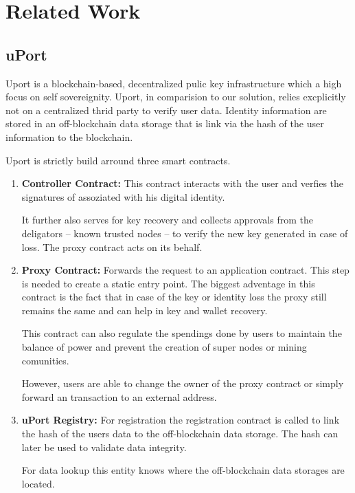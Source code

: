 \chapter{Related Work}
\label{cha:relatedwork}

\section{uPort}
Uport is a blockchain-based, decentralized pulic key infrastructure which a high focus on self sovereignity. Uport, in comparision to our solution, relies excplicitly not on a centralized thrid party to verify user data.\cite[p. 2]{uPortWhitePaper}
Identity information are stored in an off-blockchain data storage that is link via the hash of the user information to the blockchain. 

Uport is strictly build arround three smart contracts. 
\begin{enumerate}
\item \textbf{Controller Contract:} This contract interacts with the user and verfies the signatures of assoziated with his digital identity.

It further also serves for key recovery and collects approvals from the deligators -- known trusted nodes -- to verify the new key generated in case of loss.
The proxy contract acts on its behalf. 

\item \textbf{Proxy Contract:}
Forwards the request to an application contract. This step is needed to create a static entry point.
The biggest adventage in this contract is the fact that in case of the key or identity loss the proxy still remains the same and can help in key and wallet recovery.

This contract can also regulate the spendings done by users to maintain the balance of power and prevent the creation of super nodes or mining comunities.

However, users are able to change the owner of the proxy contract or simply forward an transaction to an external address\cite[p. 6]{uPortWhitePaper}.

\item \textbf{uPort Registry:}
For registration the registration contract is called to link the hash of the users data to the off-blockchain data storage. The hash can later be used to validate data integrity. 

For data lookup this entity knows where the off-blockchain data storages are located.

\end{enumerate}

